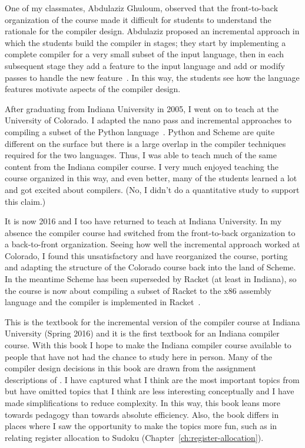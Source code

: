 \documentclass[11pt]{book}
\begin{document}
One of my classmates, Abdulaziz Ghuloum, observed that the
front-to-back organization of the course made it difficult for
students to understand the rationale for the compiler
design. Abdulaziz proposed an incremental approach in which the
students build the compiler in stages; they start by implementing a
complete compiler for a very small subset of the input language, then
in each subsequent stage they add a feature to the input language and
add or modify passes to handle the new feature~\citep{Ghuloum:2006bh}.
In this way, the students see how the language features motivate
aspects of the compiler design.

After graduating from Indiana University in 2005, I went on to teach
at the University of Colorado. I adapted the nano pass and incremental
approaches to compiling a subset of the Python
language~\citep{Siek:2012ab}.  Python and Scheme are quite different
on the surface but there is a large overlap in the compiler techniques
required for the two languages. Thus, I was able to teach much of the
same content from the Indiana compiler course. I very much enjoyed
teaching the course organized in this way, and even better, many of
the students learned a lot and got excited about compilers.  (No, I
didn't do a quantitative study to support this claim.)

It is now 2016 and I too have returned to teach at Indiana University.
In my absence the compiler course had switched from the front-to-back
organization to a back-to-front organization. Seeing how well the
incremental approach worked at Colorado, I found this unsatisfactory
and have reorganized the course, porting and adapting the structure of
the Colorado course back into the land of Scheme. In the meantime
Scheme has been superseded by Racket (at least in Indiana), so the
course is now about compiling a subset of Racket to the x86 assembly
language and the compiler is implemented in Racket~\citep{plt-tr}.

This is the textbook for the incremental version of the compiler
course at Indiana University (Spring 2016) and it is the first
textbook for an Indiana compiler course.  With this book I hope to
make the Indiana compiler course available to people that have not had
the chance to study here in person.  Many of the compiler design
decisions in this book are drawn from the assignment descriptions of
\cite{Dybvig:2010aa}. I have captured what I think are the most
important topics from \cite{Dybvig:2010aa} but have omitted topics
that I think are less interesting conceptually and I have made
simplifications to reduce complexity.  In this way, this book leans
more towards pedagogy than towards absolute efficiency. Also, the book
differs in places where I saw the opportunity to make the topics more
fun, such as in relating register allocation to Sudoku
(Chapter~\ref{ch:register-allocation}).
\end{document}
